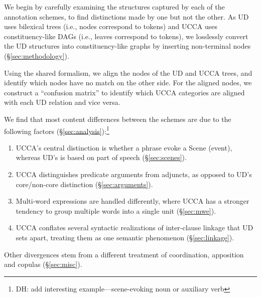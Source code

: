 \documentclass[11pt,a4paper]{article}
\newcommand{\daniel}[1]{\footnote{\color{blue}DH: #1}}
\begin{document}
  We begin by carefully examining the structures captured by each of the annotation schemes, to find distinctions made by one but not the other. As UD uses bilexical trees (i.e., nodes correspond to tokens) and UCCA uses constituency-like DAGs (i.e., leaves
  correspond to tokens), we losslessly convert the UD structures into constituency-like
  graphs by inserting non-terminal nodes (\S\ref{sec:methodology}). 
  
  Using the shared formalism, we align the nodes of the UD and UCCA trees, and identify which nodes have no match on the other side. For the aligned nodes, we construct a ``confusion matrix'' to identify which UCCA categories are aligned with each UD relation and vice versa. 
  
  
   We find that most content differences between the schemes are due to the following
   factors (\S\ref{sec:analysis}):\daniel{add interesting example---scene-evoking noun or auxiliary verb}

  \begin{enumerate}[noitemsep]
        \item UCCA's central distinction is whether a phrase evoke a Scene (event),
        whereas UD's is based on part of speech (\S\ref{sec:scenes}).
        \item UCCA distinguishes predicate arguments from adjuncts,
        as opposed to UD's core/non-core distinction (\S\ref{sec:arguments}).
        \item Multi-word expressions are handled differently,
        where UCCA has a stronger tendency to group multiple words into a single unit (\S\ref{sec:mwe}).
        \item UCCA conflates several syntactic realizations of inter-clause linkage that UD sets apart,
        treating them as one semantic phenomenon (\S\ref{sec:linkage}).
   \end{enumerate}
    
   Other divergences stem from a different treatment of coordination, apposition and copulas (\S\ref{sec:misc}).
  
\end{document}
